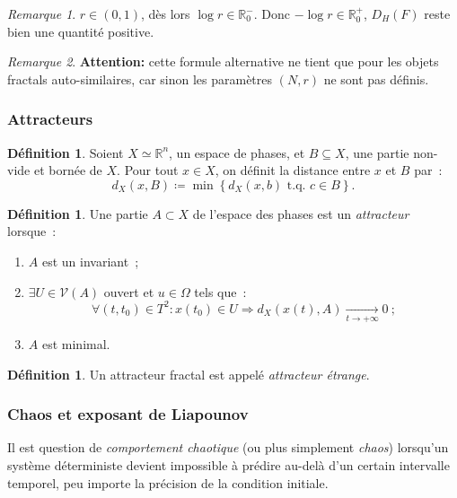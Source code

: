 \documentclass{article}
\theoremstyle{definition}
\newtheorem{déf}[thm]{Définition}
\theoremstyle{remark}
\newtheorem*{rmq}{Remarque}
\newcommand{\R}{\mathbb R}
\newcommand{\tq}{\text{ t.q. }}
\begin{document}
	\begin{rmq} $r \in (0, 1)$, dès lors $\log r \in \R_0^-$. Donc $-\log r \in \R_0^+$, $D_H(F)$ reste bien une quantité positive.
	\end{rmq}

	\begin{rmq} \textbf{Attention: } cette formule alternative ne tient que pour les objets fractals auto-similaires, car sinon les paramètres $(N, r)$ ne
	sont pas définis.
	\end{rmq}

		\subsubsection{Attracteurs}

	\begin{déf} Soient $X \simeq \R^n$, un espace de phases, et $B \subseteq X$, une partie non-vide et bornée de $X$. Pour tout $x \in X$, on définit
	la distance entre $x$ et $B$ par~:
	\[d_X(x, B) \coloneqq \min\left\{d_X(x, b) \tq c \in B\right\}.\]
	\end{déf}

	\begin{déf} Une partie $A \subset X$ de l'espace des phases est un \textit{attracteur} lorsque~:
	\begin{enumerate}
		\item $A$ est un invariant~;
		\item $\exists U \in \mathcal V(A)$ ouvert et $u \in \Omega$ tels que~:
			\[\forall (t, t_0) \in T^2 : x(t_0) \in U \Rightarrow d_X(x(t), A) \xrightarrow[t \to +\infty]{} 0~;\]
		\item $A$ est minimal.
	\end{enumerate}
	\end{déf}

	\begin{déf} Un attracteur fractal est appelé \textit{attracteur étrange}.
	\end{déf}

		\subsubsection{Chaos et exposant de Liapounov}

	Il est question de \textit{comportement chaotique} (ou plus simplement \textit{chaos}) lorsqu'un système déterministe devient impossible à prédire au-delà
	d'un certain intervalle temporel, peu importe la précision de la condition initiale.
\end{document}
